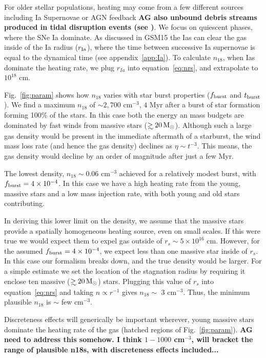 \documentclass[usenatbib,fleqn]{mnras}
\newcommand\gsim{\mathrel{\rlap{\lower4pt\hbox{\hskip1pt$\sim$}}
    \raise1pt\hbox{$>$}}}
\newcommand{\Msun}{{\rm M_\odot}}
\begin{document}
For older stellar populations, heating may come from a few different
sources including Ia Supernovae or AGN feedback {\bf AG also unbound
  debris streams produced in tidal disruption events (see
  \citep{Guillochon+2015a})}. We focus on quiescent phases, where the
SNe Ia dominate. As discussed in GSM15 the Ias can clear the gas
inside of the Ia radius ($r_{\rm Ia}$), where the time between
successive Ia supernovae is equal to the dynamical time (see
appendix~\ref{app:Ia}). To calculate $n_{18}$, when Ias dominate the
heating rate, we plug $r_{Ia}$ into equation~\eqref{eq:nrs}, and
extrapolate to $10^{18}$ cm.

Fig.~\ref{fig:param} shows how $n_{18}$ varies with star burst
properties ($f_{\rm burst}$ and $t_{\rm burst}$).  We find a maximum
$n_{18}$ of $\sim 2,700$ cm$^{-3}$, $4$ Myr after a burst of star
formation forming 100\% of the stars. In this case both the energy an
mass budgets are dominated by fast winds from massive stars ($\gsim 20
\, \Msun$).  Although such a large gas density would be present in the
immediate aftermath of a starburst, the wind mass loss rate (and hence
the gas density) declines as $\eta \sim t^{-3}$. This means, the gas
density would decline by an order of magnitude after just a few Myr.

The lowest density, $n_{18}\sim 0.06$ cm$^{-3}$ achieved for a
relatively modest burst, with $f_{\rm burst}=4\times 10^{-4}$. In this
case we have a high heating rate from the young, massive stars and a
low mass injection rate, with both young and old stars contributing.

In deriving this lower limit on the density, we assume that the
massive stars provide a spatially homogeneous heating source, even on
small scales. If this were true we would expect them to expel gas
outside of $r_s \sim 5\times 10^{16}$ cm. However, for the assumed
$f_{\rm burst}=4\times 10^{-4}$, we expect less than one massive star
inside of $r_s$.  In this case our formalism breaks down, and the true
density would be larger. For a simple estimate we set the location of
the stagnation radius by requiring it enclose ten massive ($\gsim 20
\, \Msun$) stars. Plugging this value of $r_s$ into
equation~\eqref{eq:nrs} and taking $n\propto r^{-1}$ gives $n_{18}
\sim$ 3 cm$^{-3}$. Thus, the minimum plausible $n_{18}$ is $\sim$ few
cm$^{-3}$.

Discreteness effects will generically be important wherever, young
massive stars dominate the heating rate of the gas (hatched regions of
Fig.~\ref{fig:param}). {\bf AG need to address this somehow. I think
  $1-1000$ cm$^{-3}$, will bracket the range of plausible
  n18s, with discreteness effects included...}
\end{document}
